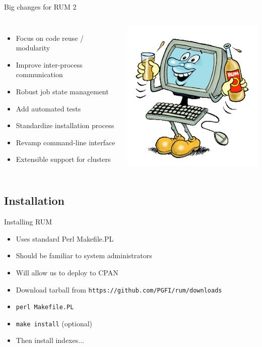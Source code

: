 \documentclass{beamer}
\begin{document}
\begin{frame}{Big changes for RUM 2}
  \begin{columns}
    \column{3in}
  \begin{itemize}
  \item Focus on code reuse / modularity
  \item Improve inter-process communication
  \item Robust job state management
  \item Add automated tests
  \item Standardize installation process
  \item Revamp command-line interface
  \item Extensible support for clusters
  \end{itemize}
  \column{2in}
  \includegraphics[scale=0.35]{rum-logo.png}
  
\end{columns}
\end{frame}

\subsection{Installation}

\begin{frame}{Installing RUM}
  \begin{itemize}
  \item Uses standard Perl Makefile.PL
  \item Should be familiar to system administrators
  \item Will allow us to deploy to CPAN
  \item Download tarball from \texttt{https://github.com/PGFI/rum/downloads}
  \item \texttt{perl Makefile.PL}
  \item \texttt{make install} (optional)
  \item Then install indexes...
  \end{itemize}
\end{frame}
\end{document}
